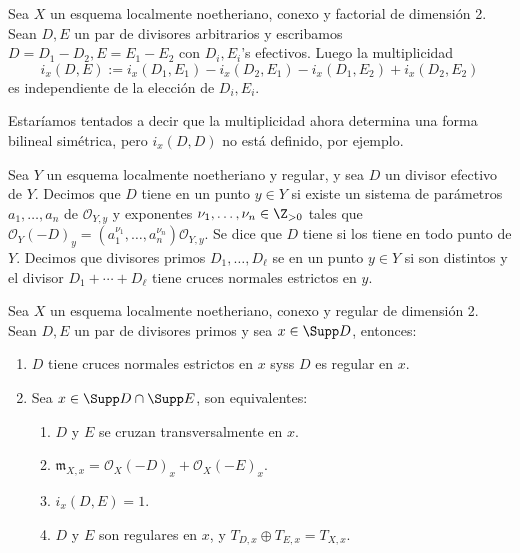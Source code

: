 \begin{mydef}
	Sea $X$ un esquema localmente noetheriano, conexo y factorial de dimensión 2.
	Sean $D, E$ un par de divisores arbitrarios y escribamos $D = D_1 - D_2, E = E_1 - E_2$ con $D_i, E_i$'s efectivos.
	Luego la multiplicidad
	$$ i_x(D, E) := i_x(D_1, E_1) - i_x(D_2, E_1) - i_x(D_1, E_2) + i_x(D_2, E_2) $$
	es independiente de la elección de $D_i, E_i$.
\end{mydef}
Estaríamos tentados a decir que la multiplicidad ahora determina una forma bilineal simétrica, pero $i_x(D, D)$ no está definido, por ejemplo.

\begin{mydef}
	Sea $Y$ un esquema localmente noetheriano y regular, y sea $D$ un divisor efectivo de $Y$.
	Decimos que $D$ tiene  en un punto $y \in Y$
	si existe un sistema de parámetros $a_1, \dots, a_n$ de $\mathscr{O}_{Y, y}$ y exponentes $\nu_1, \dots, \nu_n \in \Z_{>0}$
	tales que $\mathscr{O}_Y(-D)_y = (a_1^{\nu_1}, \dots, a_n^{\nu_n})\mathscr{O}_{Y, y}$.
	Se dice que $D$ tiene  si los tiene en todo punto de $Y$.
	Decimos que divisores primos $D_1, \dots, D_\ell$ se  en un punto $y \in Y$
	si son distintos y el divisor $D_1 + \cdots + D_\ell$ tiene cruces normales estrictos en $y$.
\end{mydef}
\begin{prop}
	Sea $X$ un esquema localmente noetheriano, conexo y regular de dimensión 2.
	Sean $D, E$ un par de divisores primos y sea $x \in \Supp D$, entonces:
	\begin{enumerate}
		\item $D$ tiene cruces normales estrictos en $x$ syss $D$ es regular en $x$.
		\item Sea $x \in \Supp D \cap \Supp E$, son equivalentes:
			\begin{enumerate}
				\item $D$ y $E$ se cruzan transversalmente en $x$.
				\item $\mathfrak{m}_{X, x} = \mathscr{O}_X(-D)_x + \mathscr{O}_X(-E)_x$.
				\item $i_x(D, E) = 1$.
				\item $D$ y $E$ son regulares en $x$, y $T_{D, x} \oplus T_{E, x} = T_{X, x}$.
			\end{enumerate}
	\end{enumerate}
\end{prop}

